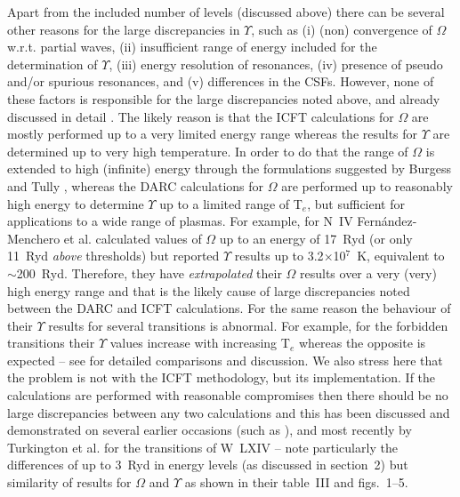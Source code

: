 \documentclass[fleqn]{article}
\begin{document}
Apart from the included number of levels (discussed above) there can be several other reasons for the large discrepancies in $\Upsilon$, such as (i) (non) convergence of $\Omega$ w.r.t. partial waves, (ii) insufficient range of energy included for the determination of $\Upsilon$, (iii) energy resolution of resonances, (iv) presence of  pseudo and/or spurious resonances, and (v) differences in  the CSFs. However, none of these factors is responsible for the large discrepancies noted above, and already discussed in detail \cite{niv, alx2}. The likely reason is that the ICFT calculations for $\Omega$ are mostly performed up to a very limited energy range whereas the results for $\Upsilon$ are determined up to very high temperature. In order to do that the range of $\Omega$ is extended to high (infinite) energy through the formulations suggested by Burgess and Tully \cite{bt}, whereas the DARC calculations for $\Omega$ are performed up to reasonably  high energy to determine $\Upsilon$ up to a limited range of T$_e$, but sufficient for applications to a wide range of plasmas. For example, for N~IV  Fern{\'a}ndez-Menchero et al. \cite{nrbelike} calculated values of $\Omega$ up to an energy of 17~Ryd (or only 11~Ryd {\em above} thresholds) but reported $\Upsilon$ results up to 3.2$\times$10$^7$~K, equivalent to $\sim$200~Ryd. Therefore, they have {\em extrapolated} their $\Omega$ results over a very (very) high energy range and that is the likely cause of large discrepancies noted between the DARC and ICFT calculations. For the same reason the behaviour of their $\Upsilon$ results for several transitions is abnormal. For example, for the forbidden transitions their $\Upsilon$ values increase with increasing T$_e$ whereas the opposite is expected -- see \cite{niv,  alx2} for detailed comparisons and discussion. We also stress here that the problem is not with the ICFT methodology, but its implementation. If the calculations are performed with reasonable compromises then there should be no large discrepancies between any two calculations and this has been discussed and demonstrated on several earlier occasions (such as \cite{icft5}), and most recently  by Turkington et al. \cite{turk} for the transitions of W~LXIV -- note particularly the differences of up to 3~Ryd in energy levels  (as discussed in section~2) but similarity of results for $\Omega$ and $\Upsilon$ as shown in their  table~III and figs.~1--5.
\end{document}
